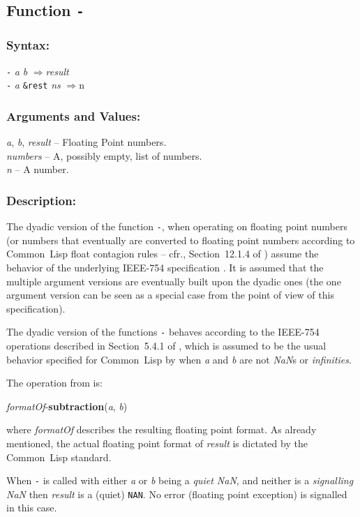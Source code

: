 \documentclass[10pt,fleqn]{article}
\newcommand{\CL}{\textsf{Common~Lisp}}
\newcommand{\code}[1]{\texttt{#1}}
\newcommand{\varname}[1]{\textit{#1}}
\newcommand{\RArrow}{$\Rightarrow$}
\newcommand{\IEEEFPStd}{IEEE-754}
\newcommand{\DDictionaryItem}[1]{\vspace*{6pt}\noindent\hrulefill\vspace*{-9pt}\subsection*{#1}}
\newcommand{\DSyntax}{\subsubsection*{Syntax:}}
\newcommand{\DArgsNValues}{\subsubsection*{Arguments and Values:}}
\newcommand{\DDescription}{\subsubsection*{Description:}}
\begin{document}
\DDictionaryItem{Function \code{-}}

\DSyntax{}

\code{-} \varname{a} \varname{b} \RArrow \varname{result}\\
\code{-} \varname{a} \code{\&rest} \varname{ns} \RArrow \varname \code{n}\\

\DArgsNValues{}

\varname{a}, \varname{b}, \varname{result} -- Floating Point numbers.\\
\varname{numbers} -- A, possibly empty, list of numbers.\\
\varname{n} -- A number.



\DDescription{}

The dyadic version of the function \code{-}, when operating on
floating point numbers (or numbers that eventually are converted to
floating point numbers according to \CL{} float contagion rules -- cfr.,
Section~12.1.4 of \cite{1996:ANSIHyperSpec}) assume the behavior of the
underlying \IEEEFPStd{} specification \cite{2008:IEEE-754}.  It is assumed that
the multiple argument versions are eventually built upon the dyadic
ones (the one argument version can be seen as a special case from
the point of view of this specification).

The dyadic version of the functions \code{-} behaves
according to the \IEEEFPStd{} operations described in Section~5.4.1 of
\cite{2008:IEEE-754}, which is assumed to be the usual behavior specified
for \CL{} by \cite{1996:ANSIHyperSpec} when \varname{a} and \varname{b} are
not \emph{NaN}s or \emph{infinities}.

\noindent
The operation from \cite{2008:IEEE-754} is:

\vspace*{3mm}

\noindent
\textit{formatOf}-\textbf{subtraction}(\varname{a}, \varname{b})

\vspace*{3mm}

\noindent
where \textit{formatOf} describes the resulting floating point
format.  As already mentioned, the actual floating point format of
\varname{result} is dictated by the \CL{} standard.

When \code{-} is called with either \varname{a} or \varname{b} being a
\emph{quiet NaN}, and neither is a \emph{signalling NaN} then
\varname{result} is a (quiet) \code{NAN}.  No error (floating point
exception) is signalled in this case.
\end{document}
